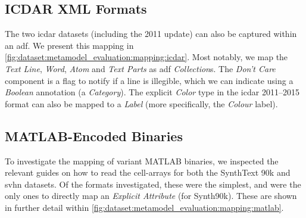 \subsection{ICDAR XML Formats}

The two \gls{icdar} datasets (including the 2011 update) can also be captured within an \gls{adf}. We present this mapping in \cref{fig:dataset:metamodel_evaluation:mapping:icdar}. Most notably, we map the \textit{Text Line}, \textit{Word}, \textit{Atom} and \textit{Text Parts} as \gls{adf} \textit{Collection}s. The \textit{Don't Care} component is a flag to notify if a line is illegible, which we can indicate using a \textit{Boolean} annotation (a \textit{Category}). The explicit \textit{Color} type in the \gls{icdar} 2011--2015 format can also be mapped to a \textit{Label} (more specifically, the \textit{Colour} label).

\subsection{MATLAB-Encoded Binaries}

To investigate the mapping of variant MATLAB binaries, we inspected the relevant guides on how to read the cell-arrays for both the SynthText 90k and \gls{svhn} datasets. Of the formats investigated, these were the simplest, and were the only ones to directly map an \textit{Explicit Attribute} (for Synth90k). These are shown in further detail within \cref{fig:dataset:metamodel_evaluation:mapping:matlab}.





